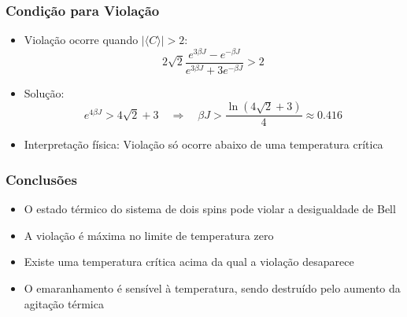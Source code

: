 \documentclass{beamer}
\begin{document}
	\begin{frame}
		\frametitle{Condição para Violação}
		\begin{itemize}
			\item Violação ocorre quando $|\langle C \rangle| > 2$:
			\[
			2\sqrt{2} \frac{e^{3\beta J} - e^{-\beta J}}{e^{3\beta J} + 3e^{-\beta J}} > 2
			\]
			\item Solução:
			\[
			e^{4\beta J} > 4\sqrt{2} + 3 \quad \Rightarrow \quad \beta J > \frac{\ln(4\sqrt{2} + 3)}{4} \approx 0.416
			\]
			\item Interpretação física: Violação só ocorre abaixo de uma temperatura crítica
		\end{itemize}
	\end{frame}
	
	\begin{frame}
		\frametitle{Conclusões}
		\begin{itemize}
			\item O estado térmico do sistema de dois spins pode violar a desigualdade de Bell
			\item A violação é máxima no limite de temperatura zero
			\item Existe uma temperatura crítica acima da qual a violação desaparece
			\item O emaranhamento é sensível à temperatura, sendo destruído pelo aumento da agitação térmica
		\end{itemize}
	\end{frame}
	
\end{document}
